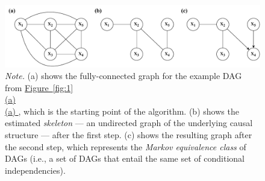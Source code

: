 \documentclass[twoside, 11pt]{article}
\newcommand*{\figref}[2][]{%
  \hyperref[{fig:#2}]{%
    Figure~\ref*{fig:#2}%
    \ifx\\#1\\%
    \else
      #1%
    \fi
  }%
}
\begin{document}
\begin{figure}[t]
    \centering
        \caption{Steps of a constraint-based method.}
        \includegraphics[width=1.0\textwidth]{figures/Fig2.pdf}
        \vspace{0.1mm}
        \caption*{\small{\textit{Note.} (a) shows the fully-connected graph for the example DAG from \figref[(a)]{1}, which is the starting point of the algorithm. (b) shows the estimated \textit{skeleton} --- an undirected graph of the underlying causal structure --- after the first step. (c) shows the resulting graph after the second step, which represents the \textit{Markov equivalence class} of DAGs (i.e., a set of DAGs that entail the same set of conditional independencies).}}
    \label{fig:2}
\end{figure}
\end{document}
